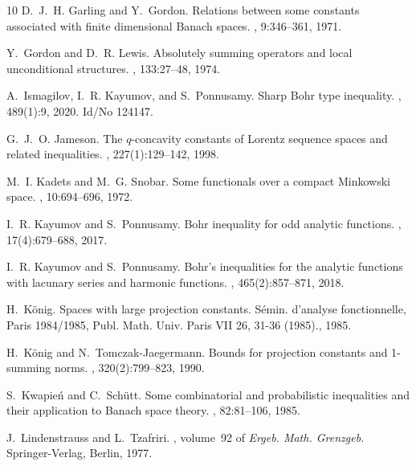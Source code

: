 \documentclass[12pt]{amsart}
\numberwithin{subsection}{section}
\theoremstyle{definition}
\theoremstyle{remark}
\begin{document}
\begin{thebibliography}{10}
D.~J.~H. Garling and Y.~Gordon.
\newblock Relations between some constants associated with finite dimensional {Banach} spaces.
, 9:346--361, 1971.

Y.~Gordon and D.~R. Lewis.
\newblock Absolutely summing operators and local unconditional structures.
, 133:27--48, 1974.

A.~Ismagilov, I.~R. Kayumov, and S.~Ponnusamy.
\newblock Sharp {Bohr} type inequality.
, 489(1):9, 2020.
\newblock Id/No 124147.

G.~J.~O. Jameson.
\newblock The {{\(q\)}}-concavity constants of {Lorentz} sequence spaces and related inequalities.
, 227(1):129--142, 1998.

M.~I. Kadets and M.~G. Snobar.
\newblock Some functionals over a compact {Minkowski} space.
, 10:694--696, 1972.

I.~R. Kayumov and S.~Ponnusamy.
\newblock Bohr inequality for odd analytic functions.
, 17(4):679--688, 2017.

I.~R. Kayumov and S.~Ponnusamy.
\newblock Bohr's inequalities for the analytic functions with lacunary series and harmonic functions.
, 465(2):857--871, 2018.

H.~K{\"o}nig.
\newblock Spaces with large projection constants.
\newblock S{\'e}min. d'analyse fonctionnelle, {Paris} 1984/1985, {Publ}. {Math}. {Univ}. {Paris} {VII} 26, 31-36 (1985)., 1985.

H.~K{\"o}nig and N.~Tomczak-Jaegermann.
\newblock Bounds for projection constants and 1-summing norms.
, 320(2):799--823, 1990.

S.~Kwapi{e}\'n and C.~Sch{\"u}tt.
\newblock Some combinatorial and probabilistic inequalities and their application to {Banach} space theory.
, 82:81--106, 1985.

J.~Lindenstrauss and L.~Tzafriri.
, volume~92 of {\em Ergeb. Math. Grenzgeb.}
\newblock Springer-Verlag, Berlin, 1977.


\end{thebibliography}
\end{document}
